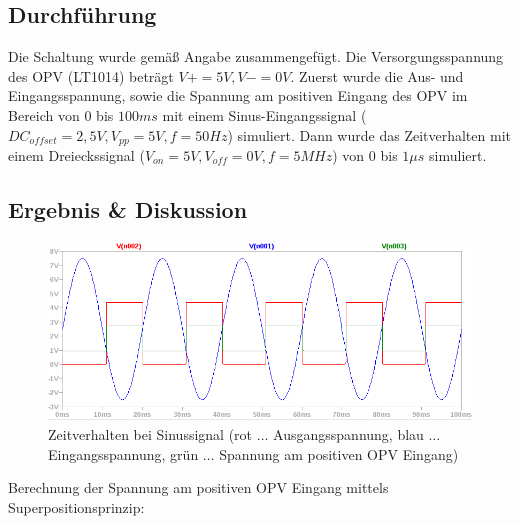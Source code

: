 \documentclass[12pt,a4paper,titlepage]{article}
\begin{document}
\subsection{Durchf\"uhrung}
Die Schaltung wurde gem\"aß Angabe zusammengef\"ugt. Die Versorgungsspannung des OPV (LT1014) betr\"agt $V+=5V,V-=0V$. Zuerst wurde die Aus- und Eingangsspannung, sowie die Spannung am positiven Eingang des OPV im Bereich von $0$ bis $100ms$ mit einem Sinus-Eingangssignal ($DC_{offset} = 2,5V, V_{pp} = 5V, f = 50Hz$) simuliert. Dann wurde das Zeitverhalten mit einem Dreieckssignal ($V_{on} = 5V, V_{off} = 0V, f = 5MHz$) von $0$ bis $1\mu s$ simuliert.

\subsection{Ergebnis \& Diskussion}

\begin{figure}[H]
  \centering
  \includegraphics[width=150mm]{schmitt_transient.png}
  \caption{Zeitverhalten bei Sinussignal (rot $\hdots$ Ausgangsspannung, blau $\hdots$ Eingangsspannung, gr\"un $\hdots$ Spannung am positiven OPV Eingang)}
\end{figure}

\noindent Berechnung der Spannung am positiven OPV Eingang mittels Superpositionsprinzip:
\end{document}
